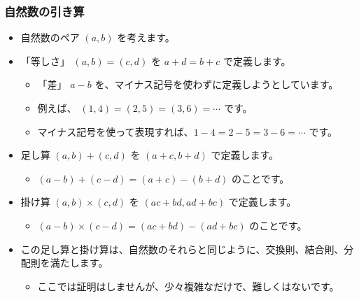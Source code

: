 \documentclass[dvipdfmx]{beamer}
\begin{document}
  \begin{frame}
    \frametitle{自然数の引き算}

    \begin{itemize}
      \item 自然数のペア $(a,b)$ を考えます。
      \item 「等しさ」 $(a,b) = (c,d)$ を $a+d = b+c$ で定義します。
      \begin{itemize}
        \item 「差」 $a - b$ を、マイナス記号を使わずに定義しようとしています。
        \item 例えば、 $(1,4) = (2,5) = (3,6) = \cdots$ です。
        \item マイナス記号を使って表現すれば、$1-4 = 2-5 = 3-6 = \cdots$ です。
      \end{itemize}

      \pause

      \item 足し算 $(a,b) + (c,d)$ を $(a+c, b+d)$ で定義します。
      \begin{itemize}
        \item $(a-b) + (c-d) = (a+c) - (b+d)$ のことです。
      \end{itemize}

      \pause

      \item 掛け算 $(a,b) \times (c,d)$ を $(ac+bd, ad+bc)$ で定義します。
      \begin{itemize}
        \item $(a-b) \times (c-d) = (ac+bd) - (ad+bc)$ のことです。
      \end{itemize}

      \pause

      \item この足し算と掛け算は、自然数のそれらと同じように、交換則、結合則、分配則を満たします。
      \begin{itemize}
        \item ここでは証明はしませんが、少々複雑なだけで、難しくはないです。
      \end{itemize}
    \end{itemize}

  \end{frame}
\end{document}
